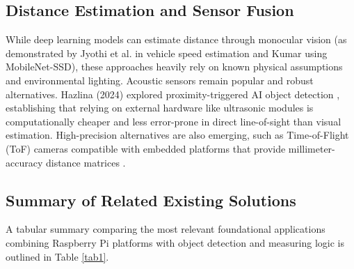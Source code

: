 \documentclass[conference]{IEEEtran}
\begin{document}
\subsection{Distance Estimation and Sensor Fusion}
While deep learning models can estimate distance through monocular vision (as demonstrated by Jyothi et al. in vehicle speed estimation \cite{b10} and Kumar \cite{b5} using MobileNet-SSD), these approaches heavily rely on known physical assumptions and environmental lighting. Acoustic sensors remain popular and robust alternatives. Hazlina (2024) explored proximity-triggered AI object detection \cite{b7}, establishing that relying on external hardware like ultrasonic modules is computationally cheaper and less error-prone in direct line-of-sight than visual estimation. High-precision alternatives are also emerging, such as Time-of-Flight (ToF) cameras compatible with embedded platforms that provide millimeter-accuracy distance matrices \cite{b6}.

\subsection{Summary of Related Existing Solutions}
A tabular summary comparing the most relevant foundational applications combining Raspberry Pi platforms with object detection and measuring logic is outlined in Table \ref{tab1}.
\end{document}
